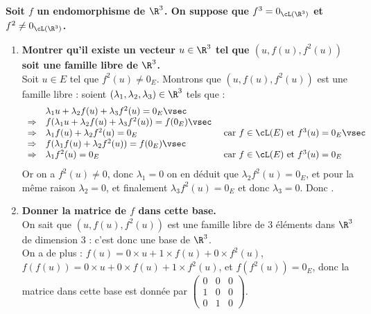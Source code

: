 \documentclass[a4paper, 11pt,reqno]{article}
\begin{document}
\begin{correction}  \;
	\textbf{Soit $f$ un endomorphisme de $\R^3$. On suppose que $f^3=0_{\cL(\R^3)}$ et $f^2\not= 0_{\cL(\R^3)}$.}
	\begin{enumerate}
		\item \textbf{Montrer qu'il existe un vecteur $u\in\R^3$ tel que $(u,f(u),f^2(u))$ soit une famille libre de $\R^3$.}\\
		      Soit $u \in E$ tel que $f^2(u) \not = 0_E$. Montrons que $(u,f(u),f^2(u))$ est une famille libre : soient $(\lambda_1, \lambda_2, \lambda_3) \in \R^3$ tels que :
		      $$\begin{array}{rll}
				                  & \lambda_1 u + \lambda_2 f(u) +\lambda_3 f^2(u) = 0_E\vsec                                                                       \\
				      \Rightarrow & f( \lambda_1 u + \lambda_2 f(u) +\lambda_3 f^2(u)) = f(0_E) \vsec                                                               \\
				      \Rightarrow & \lambda_1 f(u) + \lambda_2 f^2(u) = 0_E                           & \textmd{ car } f \in \cL(E) \textmd{ et } f^3(u) = 0_E\vsec \\
				      \Rightarrow & f(\lambda_1 f(u) + \lambda_2 f^2(u) ) = f(0_E)\vsec                                                                             \\
				      \Rightarrow & \lambda_1 f^2(u)  = 0_E                                           & \textmd{ car } f \in \cL(E) \textmd{ et } f^3(u) = 0_E
			      \end{array}$$
		      Or on a $f^2(u) \not=0$, donc $\lambda_1=0$ on en d\'eduit que $\lambda_2 f^2(u) = 0_E$, et pour la m\^eme raison $\lambda_2=0$, et finalement $\lambda_3 f^2(u) = 0_E$ et donc $\lambda_3 = 0$. Donc .
		\item \textbf{Donner la matrice de $f$ dans cette base.}\\
		      On sait que $(u,f(u),f^2(u))$ est une famille libre de $3$ \'el\'ements dans $\R^3$ de dimension $3$ : c'est donc une base de $\R^3$.\\
		      On a de plus : $f(u) = 0 \times u + 1\times f(u) + 0\times f^2(u)$, $f(f(u)) =   0 \times u + 0\times f(u) + 1\times f^2(u)$, et $f(f^2(u)) = 0_E$, donc la matrice dans cette base est donn\'ee par $\left( \begin{array}{rrr} 0 & 0 & 0\\ 1 & 0 & 0 \\ 0 & 1 & 0\end{array} \right)$.
	\end{enumerate}
\end{correction}
%
\end{document}
